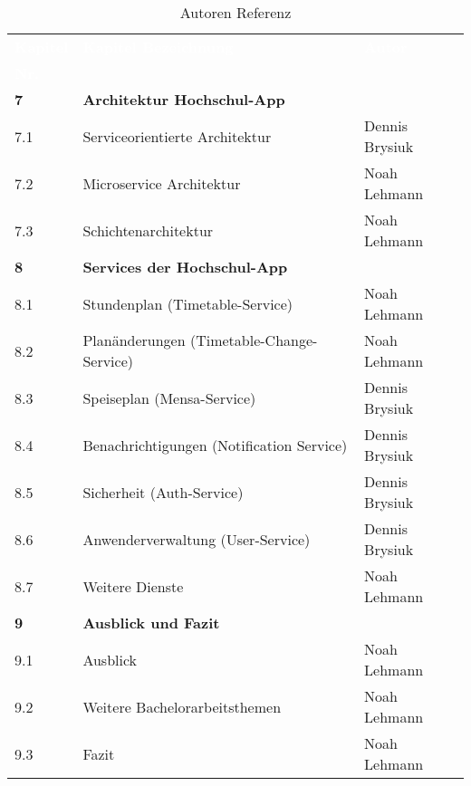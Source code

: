 \begin{table}[H]
\begin{center}
  \begin{tabular}{| l | l | l |}
 
\hline
\rowcolor{Gray}
\textcolor{white}{\textbf{Kapitel}} & \textcolor{white}{\textbf{Kapitel Bezeichnung}} & \textcolor{white}{\textbf{Autor}} \\
\rowcolor{Gray}
\textcolor{white}{\textbf{Nr.}} 	&  												  & \\  

\hline    
\rowcolor{LGray} 						
\textbf{7} & \textbf{Architektur Hochschul-App} &  				\\
\hline
7.1		& Serviceorientierte Architektur	& Dennis Brysiuk \\
\hline
7.2		& Microservice Architektur			& Noah Lehmann \\
\hline
7.3		& Schichtenarchitektur				& Noah Lehmann \\

\hline    
\rowcolor{LGray} 						
\textbf{8} & \textbf{Services der Hochschul-App}	&  				\\
\hline
8.1		& Stundenplan (Timetable-Service)			& Noah Lehmann \\
\hline
8.2		& Planänderungen (Timetable-Change-Service)	& Noah Lehmann \\
\hline
8.3		& Speiseplan (Mensa-Service)				& Dennis Brysiuk \\
\hline
8.4		& Benachrichtigungen (Notification Service)	& Dennis Brysiuk \\
\hline
8.5		& Sicherheit (Auth-Service)					& Dennis Brysiuk \\
\hline
8.6		& Anwenderverwaltung (User-Service)			& Dennis Brysiuk \\
\hline
8.7		& Weitere Dienste							& Noah Lehmann \\

\hline    
\rowcolor{LGray} 						
\textbf{9} & \textbf{Ausblick und Fazit} &  				\\
\hline
9.1		& Ausblick						& Noah Lehmann \\
\hline
9.2		& Weitere Bachelorarbeitsthemen	& Noah Lehmann \\
\hline
9.3		& Fazit							& Noah Lehmann \\
\hline

\hline
  \end{tabular}
  \end{center}
\caption[Autoren Referenz]{Autoren Referenz}
\label{tab:autoren}
\end{table}

\cleardoublepage